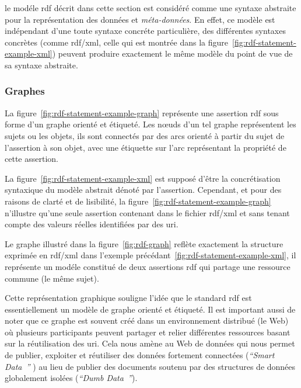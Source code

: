 le modéle \acrshort{rdf} décrit dans cette section est considéré comme
une syntaxe abstraite pour la représentation des données et
\emph{méta-données}. En effet, ce modèle est indépendant d'une toute
syntaxe concréte particulière, des différentes syntaxes concrètes
(comme \acrshort{rdf/xml}, celle qui est montrée dans la
figure~\ref{fig:rdf-statement-example-xml}) peuvent produire
exactement le même modèle du point de vue de sa syntaxe
abstraite.\medskip

\subsubsection{Graphes}
\label{sec:semantic-web-rdf-rdf-graphs}

La figure~\ref{fig:rdf-statement-example-graph} représente une
assertion \acrshort{rdf} sous forme d'un graphe orienté et
étiqueté. Les nœuds d'un tel graphe représentent les sujets ou les
objets, ils sont connectés par des arcs orienté à partir du sujet de
l'assertion à son objet, avec une étiquette sur l'arc représentant la
propriété de cette assertion.\medskip

La figure~\ref{fig:rdf-statement-example-xml} est supposé d'être la
concrétisation syntaxique du modèle abstrait dénoté par
l'assertion. Cependant, et pour des raisons de clarté et de
lisibilité, la figure~\ref{fig:rdf-statement-example-graph} n'illustre
qu'une seule assertion contenant dans le fichier \acrshort{rdf/xml} et
sans tenant compte des valeurs réelles identifiées par des
\acrshort{uri}.\medskip



Le graphe illustré dans la figure~\ref{fig:rdf-graph} reflète
exactement la structure exprimée en \acrshort{rdf/xml} dans l'exemple
précédant~\ref{fig:rdf-statement-example-xml}, il représente un modéle
constitué de deux assertions \acrshort{rdf} qui partage une ressource
commune (le même sujet).\medskip

Cette représentation graphique souligne l'idée que le standard
\acrshort{rdf} est essentiellement un modèle de graphe orienté et
étiqueté. Il est important aussi de noter que ce graphe est souvent
créé dans un environnement distribué (le Web) où plusieurs
participants peuvent partager et relier différentes ressources basant
sur la réutilisation des \acrshort{uri}. Cela nous amène au Web de
données qui nous permet de publier, exploiter et réutiliser des
données fortement connectées (\emph{``Smart
  Data~\cite{allemang2011semantic}''} ) au lieu de publier des
documents soutenu par des structures de données globalement isolées
(\emph{``Dumb Data~\cite{allemang2011semantic}''}).\medskip

